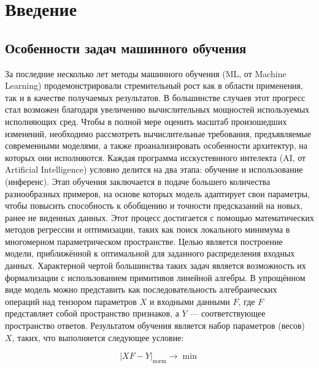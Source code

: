 \section{Введение}
\label{sec:Chapter0} 

\subsection{Особенности задач машинного обучения}

За последние несколько лет методы машинного обучения (ML, от Machine Learning) продемонстрировали стремительный рост как в области применения, так и в качестве получаемых результатов.
В большинстве случаев этот прогресс стал возможен благодаря увеличению вычислительных мощностей используемых исполняющих сред.
Чтобы в полной мере оценить масштаб произошедших изменений, необходимо рассмотреть вычислительные требования, предъявляемые современными моделями, а также проанализировать особенности архитектур, на которых они исполняются.
Каждая программа исскустевнного интелекта (AI, от Artificial Intelligence) условно делится на два этапа: обучение и использование (инференс).
Этап обучения заключается в подаче большего количества разнообразных примеров, на основе которых модель адаптирует свои параметры, чтобы повысить способность к обобщению и точности предсказаний на новых, ранее не виденных данных.
Этот процесс достигается с помощью математических методов регрессии и оптимизации, таких как поиск локального минимума в многомерном параметрическом пространстве.
Целью является построение модели, приближённой к оптимальной для заданного распределения входных данных.
Характерной чертой большинства таких задач является возможность их формализации с использованием примитивов линейной алгебры.
В упрощённом виде модель можно представить как последовательность алгебраических операций над тензором параметров $X$ и входными данными $F$, где $F$ представляет собой пространство признаков, а $Y$ — соответствующее пространство ответов.
Результатом обучения является набор параметров (весов) $X$, таких, что выполняется следующее условие:

\begin{equation}
|XF - Y|_{\text{norm}} \rightarrow \min
\end{equation}

